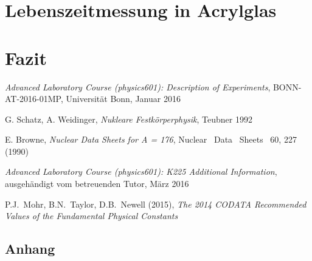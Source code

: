 \documentclass[11pt, a4paper]{article}
\numberwithin{equation}{section}
\begin{document}
\section{Lebenszeitmessung in Acrylglas}

\section{Fazit}

\FloatBarrier
\vspace{\fill}
\begin{thebibliography}{19}
	\emph{Advanced Laboratory Course (physics601): Description of Experiments},
	BONN-AT-2016-01MP, Universität Bonn, Januar 2016
	
	G. Schatz, A. Weidinger, \emph{Nukleare Festkörperphysik}, Teubner 1992
	
	E. Browne, \emph{Nuclear Data Sheets for A = 176}, Nuclear \ Data \ Sheets \ 60, 227 (1990)
	
	\emph{Advanced Laboratory Course (physics601): K225 Additional Information},
	ausgehändigt vom betreuenden Tutor, März 2016

	P.J.\ Mohr, B.N.\ Taylor, D.B.\ Newell (2015),
	\emph{The 2014 CODATA Recommended Values of the Fundamental Physical Constants}
\end{thebibliography}

\begin{appendix}
\newpage
\section{Anhang}


\end{appendix}
\end{document}

